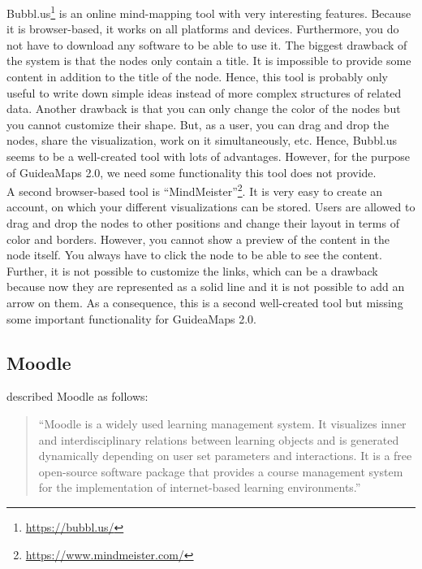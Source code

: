 Bubbl.us\footnote{\url{https://bubbl.us/}} is an online mind-mapping tool with very interesting features. Because it is browser-based, it works on all platforms and devices. Furthermore, you do not have to download any software to be able to use it. The biggest drawback of the system is that the nodes only contain a title. It is impossible to provide some content in addition to the title of the node. Hence, this tool is probably only useful to write down simple ideas instead of more complex structures of related data. Another drawback is that you can only change the color of the nodes but you cannot customize their shape. But, as a user, you can drag and drop the nodes, share the visualization, work on it simultaneously, etc. Hence, Bubbl.us seems to be a well-created tool with lots of advantages. However, for the purpose of GuideaMaps 2.0, we need some functionality this tool does not provide.\\

A second browser-based tool is ``MindMeister''\footnote{\url{https://www.mindmeister.com/}}. It is very easy to create an account, on which your different visualizations can be stored. Users are allowed to drag and drop the nodes to other positions and change their layout in terms of color and borders. However, you cannot show a preview of the content in the node itself. You always have to click the node to be able to see the content. Further, it is not possible to customize the links, which can be a drawback because now they are represented as a solid line and it is not possible to add an arrow on them. As a consequence, this is a second well-created tool but missing some important functionality for GuideaMaps 2.0.


\subsection{Moodle}

\cite{scherl2012moodle} described Moodle as follows:
\begin{quote}
	``Moodle is a widely used learning management system. It visualizes inner and interdisciplinary relations between learning objects and is generated dynamically depending on user set parameters and interactions. It is a free open-source software package that provides a course management system for the implementation of internet-based learning environments.''
\end{quote}

